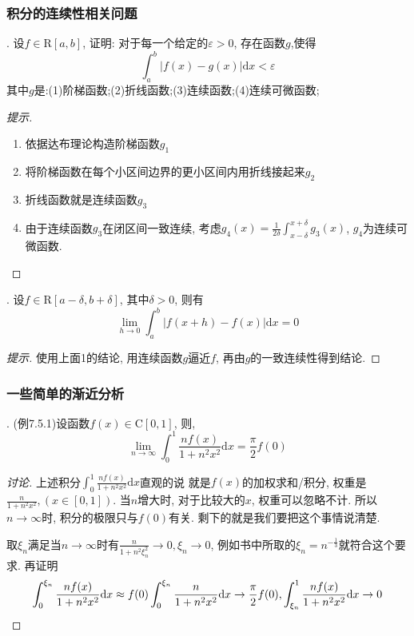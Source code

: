 \documentclass[a4paper,12pt]{article}
\begin{document}
\subsubsection*{积分的连续性相关问题}

. 设$f\in\mathrm{R}[a,b]$, 证明: 对于每一个给定的$\varepsilon>0$, 存在函数$g$,使得
\[\int_a^b|f(x)-g(x)|\mathrm{d}x<\varepsilon\]
其中$g$是:(1)阶梯函数;(2)折线函数;(3)连续函数;(4)连续可微函数;
\begin{proof}[提示]
  \ 
  \begin{enumerate}
    \item 依据达布理论构造阶梯函数$g_1$
    \item 将阶梯函数在每个小区间边界的更小区间内用折线接起来$g_2$
    \item 折线函数就是连续函数$g_3$
    \item 由于连续函数$g_3$在闭区间一致连续, 
      考虑$g_4(x)=\frac{1}{2\delta}\int_{x-\delta}^{x+\delta}g_3(x)$,
      $g_4$为连续可微函数.
  \end{enumerate}
\end{proof}

. 设$f\in\mathrm{R}[a-\delta,b+\delta]$, 其中$\delta>0$, 则有
  \[\lim_{h\to0}\int_a^b|f(x+h)-f(x)|\mathrm{d}x=0\]
  \begin{proof}[提示]
    使用上面1的结论, 用连续函数$g$逼近$f$, 
    再由$g$的一致连续性得到结论.
  \end{proof}


\subsubsection*{一些简单的渐近分析}

. (例7.5.1)设函数$f(x)\in\mathrm{C}[0,1]$, 则,
    \[
\lim_{n\to\infty}\int_0^1\frac{nf(x)}{1+n^2x^2}\mathrm{d}x=\frac{\pi}{2}f(0)
    \]
  \begin{proof}[讨论]
    上述积分$\int_0^1\frac{nf(x)}{1+n^2x^2}\mathrm{d}x$直观的说
    就是$f(x)$的加权求和/积分, 
    权重是$\frac{n}{1+n^2x^2},(x\in[0,1])$. 当$n$增大时, 
    对于比较大的$x$, 权重可以忽略不计. 所以$n\to\infty$时, 
    积分的极限只与$f(0)$有关. 剩下的就是我们要把这个事情说清楚.

    取$\xi_n$满足当$n\to\infty$时有$\frac{n}{1+n^2\xi_n^2}\to0,\xi_n\to0$,
    例如书中所取的$\xi_n=n^{-\frac{1}{3}}$就符合这个要求.
    再证明
    \[
      \int_0^{\xi_n}\frac{nf(x)}{1+n^2x^2}\mathrm{d}x\approx f(0)\int_0^{\xi_n}\frac{n}{1+n^2x^2}\mathrm{d} x\to\frac{\pi}{2}f(0),
      \int_{\xi_n}^1\frac{nf(x)}{1+n^2x^2}\mathrm{d}x\to0
    \]
    
  \end{proof}
\end{document}
